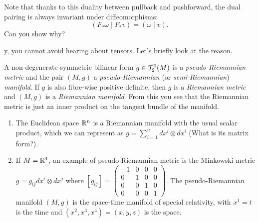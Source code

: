 Note that thanks to this duality between pullback and pushforward, the dual pairing is always invariant under diffeomorphisms:
\begin{equation}\label{eq:pairdualitypull}
	(F_* \omega \mid F_* v) = (\omega \mid v).
\end{equation}
Can you show why?

y, you cannot avoid hearing about tensors.
Let's briefly look at the reason.

\begin{definition}
	A non-degenerate symmetric bilinear form $g\in \mathcal{T}_2^0(M)$ is a \emph{pseudo-Riemannian metric} and the pair $(M,g)$ a \emph{pseudo-Riemannian} (or \emph{semi-Riemannian}) \emph{manifold}.
	If $g$ is also fibre-wise positive definite, then $g$ is a \emph{Riemannian metric} and $(M,g)$ is a \emph{Riemannian manifold}.
	From this you see that the Riemannian metric is just an inner product on the tangent bundle of the manifold.
\end{definition}

\begin{example}
	\begin{enumerate}
		\item The Euclidean space $\mathbb{R}^n$ is a Riemannian manifold with the usual scalar product, which we can represent as $g = \sum_{i=1}^n dx^i\otimes dx^i$ (What is its matrix form?).
		\item If $M=\mathbb{R}^4$, an example of pseudo-Riemannian metric is the Minkowski metric $g = g_{ij} dx^i\otimes dx^j$ where $[g_{ij}] = {\left(\begin{smallmatrix} -1 & 0 & 0 & 0\\ 0 & 1 & 0 & 0 \\ 0 & 0 & 1 & 0 \\ 0 & 0 & 0 & 1 \end{smallmatrix}\right)}$. The pseudo-Riemannian manifold $(M, g)$ is the space-time manifold of special relativity, with $x^1 = t$ is the time and $(x^2, x^3, x^4) = (x,y,z)$ is the space.
	\end{enumerate}
\end{example}

